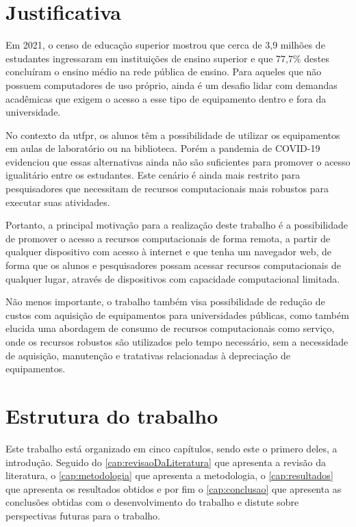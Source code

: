 \section{Justificativa}
\label{sec:justificativa}

Em 2021, o censo de educação superior mostrou que cerca de 3,9 milhões de estudantes ingressaram em
instituições de ensino superior e que 77,7\% destes concluíram o ensino médio na rede pública de
ensino. \citep{inep2021}
Para aqueles que não possuem computadores de uso próprio, ainda é um desafio lidar com demandas
acadêmicas que exigem o acesso a esse tipo de equipamento dentro e fora da universidade.

No contexto da \gls{utfpr}, os alunos têm a possibilidade de utilizar os equipamentos em aulas de
laboratório ou na biblioteca. Porém a pandemia de COVID-19 evidenciou que essas alternativas ainda
não são suficientes para promover o acesso igualitário entre os estudantes. Este cenário é ainda mais
restrito para pesquisadores que necessitam de recursos computacionais mais robustos para executar
suas atividades.

Portanto, a principal motivação para a realização deste trabalho é a possibilidade de promover o
acesso a recursos computacionais de forma remota, a partir de qualquer dispositivo com acesso à
internet e que tenha um navegador web, de forma que os alunos e pesquisadores possam acessar
recursos computacionais de qualquer lugar, através de dispositivos com capacidade computacional
limitada.

Não menos importante, o trabalho também visa possibilidade de redução de custos com aquisição de equipamentos para universidades públicas, como também elucida uma abordagem de consumo de recursos computacionais como serviço, onde os  recursos robustos são utilizados pelo tempo necessário, sem a necessidade de aquisição, manutenção e tratativas relacionadas à depreciação de equipamentos.

\section{Estrutura do trabalho}
\label{sec:estruturaTrabalho}

Este trabalho está organizado em cinco capítulos, sendo este o primero deles, a introdução. Seguido do \autoref{cap:revisaoDaLiteratura} que apresenta a revisão da literatura, o \autoref{cap:metodologia} que apresenta a metodologia, o \autoref{cap:resultados} que apresenta os resultados obtidos e por fim o \autoref{cap:conclusao} que apresenta as conclusões obtidas com o desenvolvimento do trabalho e distute sobre perspectivas futuras para o trabalho.

